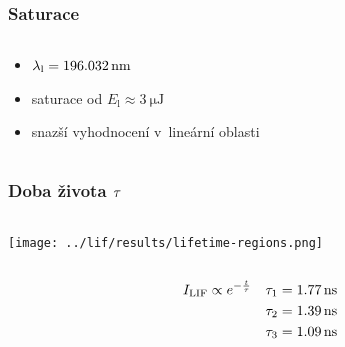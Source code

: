 \documentclass{beamer}
\newcommand\itylif{I_\text{LIF}}
\newcommand\en{E}
\renewcommand\enlaser{\en_\text{l}}
\newcommand\wavelenlaser{\wavelen_\text{l}}
\begin{document}
\begin{frame}
	\frametitle{Saturace}
	\begin{columns}[c]
		\begin{column}{0.38\textwidth}
			\begin{itemize}
				\item $\wavelenlaser = \SI{196.032}{\nano\metre}$
				\item saturace od $\enlaser \approx \SI{3}{\micro\joule}$
				\item snazší vyhodnocení v~lineární oblasti
			\end{itemize}
		\end{column}
		\begin{column}{0.58\textwidth}
		\end{column}
	\end{columns}
\end{frame}

\begin{frame}
	\frametitle{Doba života $\tau$}
	\begin{columns}[c]
		\begin{column}{0.38\textwidth}
			\texttt{[image: ../lif/results/lifetime-regions.png]}
		\end{column}
		\begin{column}{0.58\textwidth}
		\end{column}
	\end{columns}
	\begin{align*}
		\itylif &\propto \eu^{-\frac{\tim}{\lifetime}}
		& \lifetime_1 &= \SI{1.77}{\nano\second} \\
		& & \lifetime_2 &= \SI{1.39}{\nano\second} \\
		& & \lifetime_3 &= \SI{1.09}{\nano\second}
	\end{align*}
\end{frame}

\newcommand\vol{V}
\newcommand\dens{n}
\newcommand\lifsens{D_\text{F}}
\newcommand\rayleighsens{D_\text{R}}
\newcommand\lifsignal{M_\text{t}}
\newcommand\rayleighsignal{M_\text{R}}
\newcommand\rayleighxsec{\dv{\sigma_\text{R}}{\Omega}}
\newcommand\enrayleigh{E_\text{lR}}
\renewcommand\dd[1]{\,\mathsf{d}#1}
\renewcommand\dv[2]{\frac{\text{d}#1}{\text{d}#2}}
\end{document}
